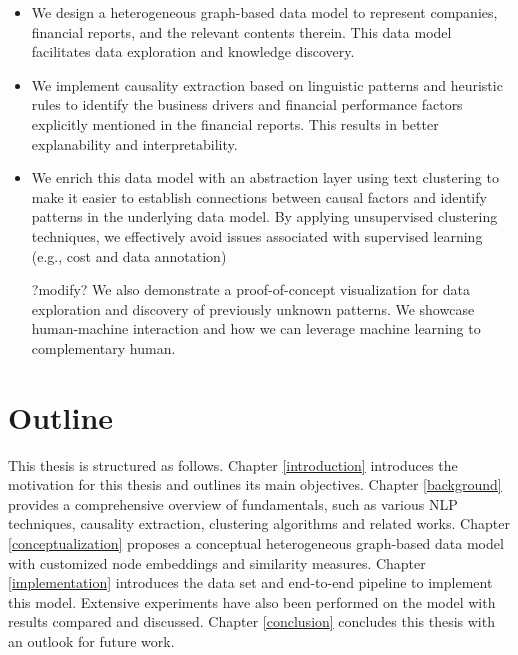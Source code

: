 \begin{itemize}

\item We design a heterogeneous graph-based data model to represent companies, financial reports, and the relevant contents therein. This data model facilitates data exploration and knowledge discovery.  
\item We implement causality extraction based on linguistic patterns and heuristic rules to identify the business drivers and financial performance factors explicitly mentioned in the financial reports. This results in better explanability and interpretability. 
\item We enrich this data model with an abstraction layer using text clustering to make it easier to establish connections between causal factors and identify patterns in the underlying data model. By applying unsupervised clustering techniques, we effectively avoid issues associated with supervised learning (e.g., cost and data annotation)
\item [?modify?] We also demonstrate a proof-of-concept visualization for data exploration and discovery of previously unknown patterns. We showcase human-machine interaction and how we can leverage machine learning to complementary human.

\end{itemize}



\section{Outline}

This thesis is structured as follows. Chapter \ref{introduction} introduces the motivation for this thesis and outlines its main objectives. Chapter \ref{background} provides a comprehensive overview of fundamentals, such as various NLP techniques, causality extraction, clustering algorithms and related works. Chapter \ref{conceptualization} proposes a conceptual heterogeneous graph-based data model with customized node embeddings and similarity measures. Chapter \ref{implementation} introduces the data set and end-to-end pipeline to implement this model. Extensive experiments have also been performed on the model with results compared and discussed. Chapter \ref{conclusion} concludes this thesis with an outlook for future work. 


